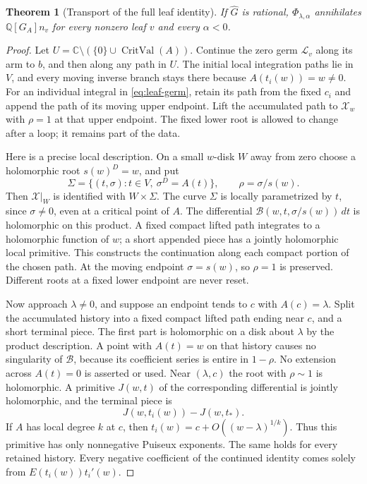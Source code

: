 \documentclass[11pt]{article}
\numberwithin{equation}{section}
\newtheorem{theorem}{Theorem}[section]
\theoremstyle{definition}\newtheorem{definition}[theorem]{Definition}
\theoremstyle{remark}\newtheorem{remark}[theorem]{Remark}
\newcommand{\C}{\mathbb C}
\newcommand{\Q}{\mathbb Q}
\newcommand{\HH}{\widehat G}
\newcommand{\dd}{\,d}
\newcommand{\Crit}{\operatorname{CritVal}}
\begin{document}
\begin{theorem}[Transport of the full leaf identity]\label{thm:transport}
If $\HH$ is rational, $\Phi_{\lambda,\alpha}$ annihilates
$\Q[G_A]n_v$ for every nonzero leaf $v$ and every $\alpha<0$.
\end{theorem}
\begin{proof}
Let $U=\C\setminus(\{0\}\cup\Crit(A))$. Continue the zero germ
$\mathscr L_v$ along its arm to $b$, and then along any path in $U$.
The initial local integration paths lie in $V$, and every moving
inverse branch stays there because $A(t_i(w))=w\ne0$.
For an individual integral in \eqref{eq:leaf-germ}, retain its path
from the fixed $c_i$ and append
the path of its moving upper endpoint. Lift the accumulated path to
$\mathscr X_w$ with $\rho=1$ at that upper endpoint. The fixed lower
root is allowed to change after a loop; it remains part of the data.

Here is a precise local description. On a small $w$-disk $W$ away from
zero choose a holomorphic root $s(w)^D=w$, and put
\[
 \Sigma=\{(t,\sigma):t\in V,\ \sigma^D=A(t)\},
 \qquad \rho=\sigma/s(w).
\]
Then $\mathscr X|_W$ is identified with $W\times\Sigma$.
The curve $\Sigma$ is locally parametrized by $t$, since $\sigma\ne0$,
even at a critical point of $A$. The differential
$\mathscr B(w,t,\sigma/s(w))\dd t$ is holomorphic on this product.
A fixed compact lifted path integrates to a holomorphic function of $w$;
a short appended piece has a jointly holomorphic local primitive.
This constructs the continuation along each compact portion of the
chosen path. At the moving endpoint $\sigma=s(w)$, so $\rho=1$ is
preserved. Different roots at a fixed lower endpoint are never reset.

Now approach $\lambda\ne0$, and suppose an endpoint tends to $c$ with
$A(c)=\lambda$. Split the accumulated history into a fixed compact lifted
path ending near $c$, and a short terminal piece. The first part is
holomorphic on a disk about $\lambda$ by the product description. A
point with $A(t)=w$ on that history causes no singularity of
$\mathscr B$, because its coefficient series is entire in $1-\rho$.
No extension across $A(t)=0$ is asserted or used.
Near $(\lambda,c)$ the root with $\rho\sim1$ is holomorphic. A primitive
$J(w,t)$ of the corresponding differential is jointly holomorphic, and
the terminal piece is
\[
 J(w,t_i(w))-J(w,t_*).
\]
If $A$ has local degree $k$ at $c$, then
$t_i(w)=c+O((w-\lambda)^{1/k})$. Thus this primitive has only
nonnegative Puiseux exponents. The same holds for every retained history.
Every negative coefficient of the continued identity comes solely from
$E(t_i(w))t_i'(w)$.


\end{proof}
\end{document}
